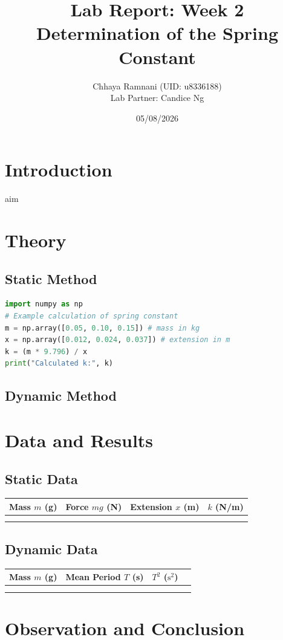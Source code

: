 \documentclass[11pt,a4paper]{article}
\begin{document}
\title{Lab Report: Week 2 \\ Determination of the Spring Constant}
\author{Chhaya Ramnani (UID: u8336188) \\ Lab Partner: Candice Ng}
\date{05/08/2026}
\maketitle


\section{Introduction}
aim

\section{Theory}

\subsection{Static Method}

\begin{lstlisting}[language=Python]
import numpy as np
# Example calculation of spring constant
m = np.array([0.05, 0.10, 0.15]) # mass in kg
x = np.array([0.012, 0.024, 0.037]) # extension in m
k = (m * 9.796) / x
print("Calculated k:", k)
\end{lstlisting}

\subsection{Dynamic Method}


\section{Data and Results}

\subsection{Static Data}

\begin{center}
\begin{tabular}{|c|c|c|c|}
\hline
Mass $m$ (g) & Force $mg$ (N) & Extension $x$ (m) & $k$ (N/m) \\
\hline
& & & \\
\hline
& & & \\
\hline
\end{tabular}
\end{center}

\subsection{Dynamic Data}
\begin{center}
\begin{tabular}{|c|c|c|c|}
\hline
Mass $m$ (g) & Mean Period $T$ (s) & $T^2$ ($\mathrm{s}^2$) \\
\hline
& & \\
\hline
& & \\
\hline
\end{tabular}
\end{center}

\section{Observation and Conclusion}
\end{document}
